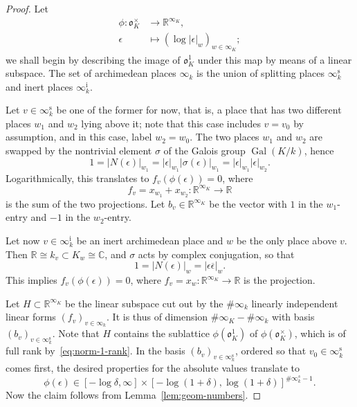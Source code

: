 \documentclass[10pt,a4paper]{amsart}
\DeclareMathOperator{\Gal}{Gal}
\newcommand{\CC}{\mathbb{C}}
\newcommand{\RR}{\mathbb{R}}
\newcommand{\fo}{\mathfrak{o}}
\begin{document}
\begin{proof}
	Let 
	\begin{align*}
		\phi \colon \fo_K^\times &\to \RR^{\infty_K},\\\epsilon & \mapsto (\log |\epsilon|_w)_{w\in \infty_K};
	\end{align*}
	we shall begin by describing the image of $\fo_K^1$ under this map by means of a linear subspace.
	The set of archimedean places $\infty_k$ is the union of splitting places $\infty_k^{\mathrm s}$ and inert places $\infty_k^{\mathrm i}$. 

	Let $v\in \infty_k^{\mathrm s}$ be one of the former for now, that is, a place that has two different places $w_1$ and $w_2$ lying above it; note that this case includes $v=v_0$ by assumption, and in this case, label $w_2 = w_0$.
	The two places $w_1$ and $w_2$ are swapped by the nontrivial element $\sigma$ of the Galois group $\Gal(K/k)$, hence
	\begin{equation*}
		1 = |N(\epsilon)|_{w_1} = |\epsilon|_{w_1}|\sigma(\epsilon)|_{w_1} = |\epsilon|_{w_1}|\epsilon|_{w_2}.
	\end{equation*}
	Logarithmically, this translates to
	$f_{v}(\phi(\epsilon))=0$, where
	\begin{equation*}
		f_{v} = x_{w_1}+x_{w_2}\colon \RR^{\infty_K}\to \RR
	\end{equation*}
	is the sum of the two projections.
	Let $b_{v}\in\RR^{\infty_K}$ be the vector with $1$ in the $w_1$-entry and $-1$ in the $w_2$-entry.

	Let now $v\in \infty_k^{\mathrm i}$ be an inert archimedean place and $w$ be the only place above $v$. Then $\RR\cong k_{v} \subset K_{w}\cong \CC$, and $\sigma$ acts by complex conjugation, so that
	\begin{equation*}
		1 = |N(\epsilon)|_{w} = |\epsilon\overline{\epsilon}|_w.
	\end{equation*}
	This implies $f_{v}(\phi(\epsilon))=0$, where $f_{v} = x_w\colon \RR^{\infty_K}\to \RR$ is the projection.
	
    Let $H\subset \RR^{\infty_K}$ be the linear subspace cut out by the $\# \infty_k$ linearly independent linear forms $(f_{v})_{v\in\infty_k}$. It is thus of dimension $\#\infty_K - \#\infty_k$ with basis $(b_{v})_{v\in \infty_k^{\mathrm s}}$.
    Note that $H$ contains the sublattice $\phi(\fo_K^1)$ of $\phi(\fo_K^\times)$, which is of full rank by~\eqref{eq:norm-1-rank}.
	In the basis $(b_{v})_{v\in\infty_k^{\mathrm s}}$, ordered so that $v_0\in \infty_k^{\mathrm s}$ comes first, the desired properties for the absolute values translate to
	\begin{equation*}
		\phi(\epsilon) \in [- \log \delta ,\infty] \times [-\log (1+\delta), \log(1+\delta)]^{\#\infty_k^s -1}.
	\end{equation*}
	Now the claim follows from Lemma~\ref{lem:geom-numbers}.
\end{proof}
\end{document}
